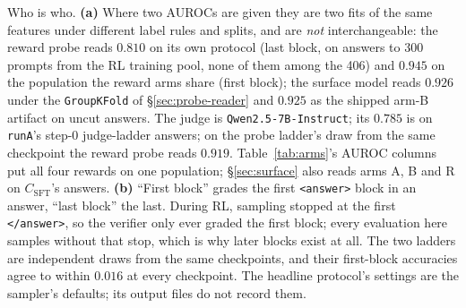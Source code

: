 \documentclass{article}
\begin{document}
\begin{table}[t]
\caption{Who is who. \textbf{(a)} Where two AUROCs are given they are two fits of the same features under different label rules and splits, and are \emph{not} interchangeable: the reward probe reads $0.810$ on its own protocol (last block, on answers to 300 prompts from the RL training pool, none of them among the 406) and $0.945$ on the population the reward arms share (first block); the surface model reads $0.926$ under the \texttt{GroupKFold} of \S\ref{sec:probe-reader} and $0.925$ as the shipped arm-B artifact on uncut answers. The judge is \texttt{Qwen2.5-7B-Instruct}; its $0.785$ is on \texttt{runA}'s step-0 judge-ladder answers; on the probe ladder's draw from the same checkpoint the reward probe reads $0.919$. Table~\ref{tab:arms}'s AUROC columns put all four rewards on one population; \S\ref{sec:surface} also reads arms A, B and R on $C_{\text{SFT}}$'s answers. \textbf{(b)} ``First block'' grades the first \texttt{<answer>} block in an answer, ``last block'' the last. During RL, sampling stopped at the first \texttt{</answer>}, so the verifier only ever graded the first block; every evaluation here samples without that stop, which is why later blocks exist at all. The two ladders are independent draws from the same checkpoints, and their first-block accuracies agree to within $0.016$ at every checkpoint. The headline protocol's settings are the sampler's defaults; its output files do not record them.}
\label{tab:actors}
\end{table}
\end{document}
